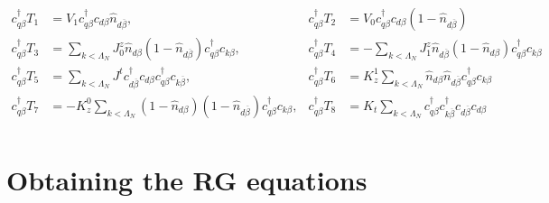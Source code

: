\documentclass[twoside]{report}
\numberwithin{equation}{section}
\begin{document}
\begin{equation}\begin{aligned}
	c^\dagger_{q\beta}T_1 &= V_1 c^\dagger_{q\beta}c_{d\beta}\hat n_{d\overline\beta}, &c^\dagger_{q\beta}T_2 &= V_0 c^\dagger_{q\beta}c_{d\beta}\left(1 - \hat n_{d\overline\beta}\right)\\
	c^\dagger_{q\beta}T_3 &= \sum_{k<\Lambda_N}J^z_0 \hat n_{d\beta}\left(1 - \hat n_{d\overline\beta}\right) c^\dagger_{q\beta}c_{k\beta}, &c^\dagger_{q\beta}T_4 &= -\sum_{k<\Lambda_N}J^z_1 \hat n_{d\overline\beta}\left(1 - \hat n_{d\beta}\right) c^\dagger_{q\beta}c_{k\beta}\\
	c^\dagger_{q\beta}T_5 &= \sum_{k<\Lambda_N}J^t c^\dagger_{d\overline\beta}c_{d\beta}c^\dagger_{q\beta}c_{k\overline\beta}, &c^\dagger_{q\beta}T_6 &= K_z^1 \sum_{k<\Lambda_N}\hat n_{d\beta}\hat n_{d\overline\beta}c^\dagger_{q\beta}c_{k\beta}\\
	c^\dagger_{q\beta}T_7 &= -K_z^0 \sum_{k<\Lambda_N}\left(1 - \hat n_{d\beta}\right)\left(1 - \hat n_{d\overline\beta}\right)c^\dagger_{q\beta}c_{k\beta}, &c^\dagger_{q\beta}T_8 &= K_t \sum_{k<\Lambda_N}c^\dagger_{q\beta}c^\dagger_{k\overline\beta}c_{d\overline\beta}c_{d\beta}\\
\end{aligned}\end{equation}

\section{Obtaining the RG equations}
\end{document}
